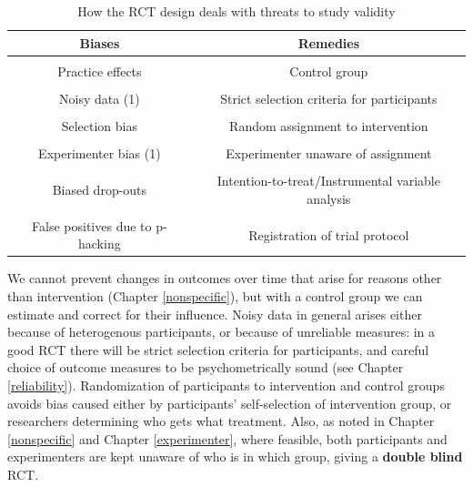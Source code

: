 \documentclass{krantz}
\begin{document}
\begin{table}

\caption{\label{tab:rctchart}How the RCT design deals with threats to study validity}
\centering
\begin{tabular}[t]{cc}
\toprule
Biases & Remedies\\
\midrule
\cellcolor{gray!6}{Spontaneous improvement} & \cellcolor{gray!6}{Control group}\\
Practice effects & Control group\\
\cellcolor{gray!6}{Regression to the mean} & \cellcolor{gray!6}{Control group}\\
Noisy data (1) & Strict selection criteria for participants\\
\cellcolor{gray!6}{Noisy data (2)} & \cellcolor{gray!6}{Outcomes with low measurement error}\\
\addlinespace
Selection bias & Random assignment to intervention\\
\cellcolor{gray!6}{Placebo effects} & \cellcolor{gray!6}{Participant unaware of assignment}\\
Experimenter bias (1) & Experimenter unaware of assignment\\
\cellcolor{gray!6}{Experimenter bias (2)} & \cellcolor{gray!6}{Strictly specified protocol}\\
Biased drop-outs & Intention-to-treat/Instrumental variable analysis\\
\addlinespace
\cellcolor{gray!6}{Low power} & \cellcolor{gray!6}{A priori power analysis}\\
False positives due to p-hacking & Registration of trial protocol\\
\bottomrule
\end{tabular}
\end{table}

We cannot prevent changes in outcomes over time that arise for reasons other than intervention (Chapter \ref{nonspecific}), but with a control group we can estimate and correct for their influence. Noisy data in general arises either because of heterogenous participants, or because of unreliable measures: in a good RCT there will be strict selection criteria for participants, and careful choice of outcome measures to be psychometrically sound (see Chapter \ref{reliability}). Randomization of participants to intervention and control groups avoids bias caused either by participants' self-selection of intervention group, or researchers determining who gets what treatment. Also, as noted in Chapter \ref{nonspecific} and Chapter \ref{experimenter}, where feasible, both participants and experimenters are kept unaware of who is in which  group, giving a \textbf{double blind} RCT.
\end{document}
